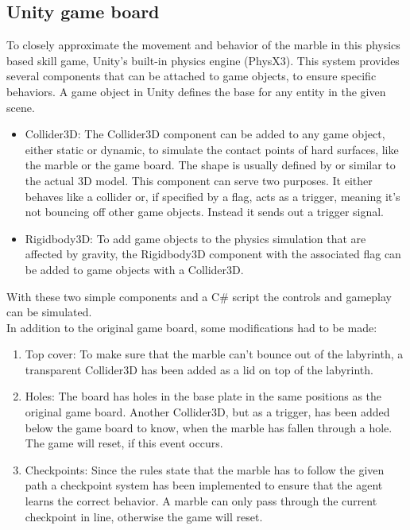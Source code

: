 \subsection{Unity game board}\label{subsec:unity-game-board}
To closely approximate the movement and behavior of the marble in this physics based skill game,
Unity's built-in physics engine (PhysX3).
This system provides several components that can be attached to game objects, to ensure specific behaviors.
A game object in Unity defines the base for any entity in the given scene.
\begin{itemize}
    \item{Collider3D}: The Collider3D component can be added to any game object, either static or dynamic, to simulate the contact points of hard surfaces, like the marble or the game board.
    The shape is usually defined by or similar to the actual 3D model.
    This component can serve two purposes.
    It either behaves like a collider or, if specified by a flag, acts as a trigger, meaning it's not bouncing off other game objects.
    Instead it sends out a trigger signal.
    \item{Rigidbody3D}: To add game objects to the physics simulation that are affected by gravity, the Rigidbody3D component with the associated flag can be added to game objects with a Collider3D.
\end{itemize}
With these two simple components and a C\# script the controls and gameplay can be simulated.\\
In addition to the original game board, some modifications had to be made:
\begin{enumerate}
    \item{Top cover}: To make sure that the marble can't bounce out of the labyrinth, a transparent Collider3D has been
    added as a lid on top of the labyrinth.
    \item{Holes}: The board has holes in the base plate in the same positions as the original game board.
    Another Collider3D, but as a trigger, has been added below the game board to know, when the marble has fallen through a hole.
    The game will reset, if this event occurs.
    \item{Checkpoints}: Since the rules state that the marble has to follow the given path a checkpoint system has been implemented to ensure that the agent learns the correct behavior.
    A marble can only pass through the current checkpoint in line, otherwise the game will reset.
\end{enumerate}